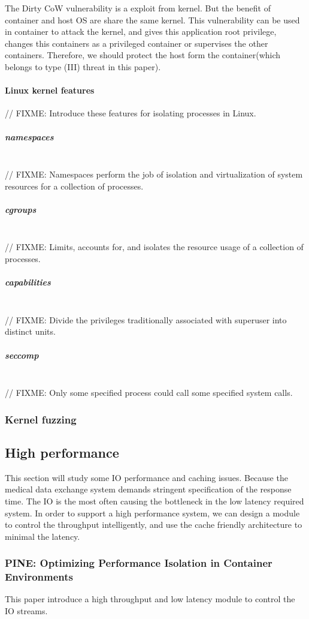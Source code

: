 \documentclass[12pt,a4paper]{IEEEconf}
\begin{document}
The Dirty CoW vulnerability is a exploit from kernel. But the benefit
of container and host OS are share the same kernel. This vulnerability can be used in
container to attack the kernel, and gives this application root privilege, changes this
containers as a privileged container or supervises the other containers. Therefore, we should
protect the host form the container(which belongs to type (\RN{3}) threat in this paper).

\paragraph{Linux kernel features}
// FIXME: Introduce these features for isolating processes in Linux.

\subparagraph{namespaces}\mbox{}\\
// FIXME: Namespaces perform the job of isolation and virtualization of system resources
for a collection of processes.\cite{Road_Ahead}

\subparagraph{cgroups}\mbox{}\\
// FIXME: Limits, accounts for, and isolates the resource usage of a collection of processes.
\cite{cgroup_wiki}

\subparagraph{capabilities}\mbox{}\\
// FIXME: Divide the privileges traditionally associated with superuser into distinct
units.

\subparagraph{seccomp}\mbox{}\\
// FIXME: Only some specified process could call some specified system calls.

\subsubsection{Kernel fuzzing}

\hypertarget{heigh_performance}{\subsection{High performance}}
This section will study some IO performance and caching issues. Because the medical
data exchange system demands stringent specification of the response time.
The IO is the most often causing the bottleneck in the low latency required system.
In order to support a high performance system, we can design a module to control
the throughput intelligently, and use the cache friendly architecture to minimal the
latency.

\subsubsection{PINE: Optimizing Performance Isolation in Container Environments}
This paper\cite{Optimizing} introduce a high throughput and low latency module to control
the IO streams.
\end{document}
